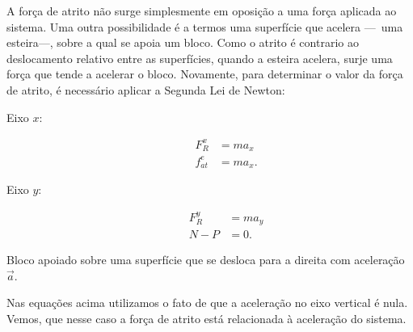 A força de atrito não surge simplesmente em oposição a uma força aplicada ao sistema. Uma outra possibilidade é a termos uma superfície que acelera ---~uma esteira---, sobre a qual se apoia um bloco. Como o atrito é contrario ao deslocamento relativo entre as superfícies, quando a esteira acelera, surje uma força que tende a acelerar o bloco. Novamente, para determinar o valor da força de atrito, é necessário aplicar a Segunda Lei de Newton:
\begin{description}
    \item[Eixo $x$:]
        \begin{align}
            F_R^x &= m a_x \\
            f_{at}^e &= m a_x.
        \end{align}
    \item[Eixo $y$:]
        \begin{align}
            F_R^y &= m a_y \\
            N - P &= 0.
        \end{align}
\end{description}

\begin{marginfigure}
\centering
{}
\caption{Bloco apoiado sobre uma superfície que se desloca para a direita com aceleração $\vec{a}$.}
\end{marginfigure}
%
\noindent{}Nas equações acima utilizamos o fato de que a aceleração no eixo vertical é nula. Vemos, que nesse caso a força de atrito está relacionada à aceleração do sistema.

